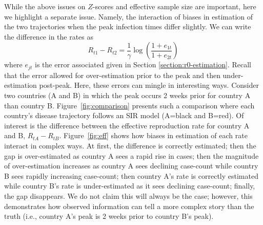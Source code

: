 \documentclass[11pt]{amsart}
\begin{document}
While the above issues on $Z$-scores and effective sample size are important, here we highlight a separate issue.  Namely, the interaction of biases in estimation of the two trajectories when the peak infection times differ slightly.  We can write the difference in the rates as
$$
R_{t1} - R_{t2} = \frac{1}{\gamma} \log \left( \frac{1 + e_{1t}}{1+e_{2t}} \right)
$$
where $e_{jt}$ is the error associated given in Section \ref{section:r0-estimation}.  Recall that the error allowed for over-estimation prior to the peak and then under-estimation post-peak.  Here, these errors can mingle in interesting ways.  Consider two countries (A and B) in which the peak occurs 2 weeks prior for country A than country B.  Figure~\ref{fig:comparison} presents such a comparison where each country's disease trajectory follows an SIR model (A=black and B=red). Of interest is the difference between the effective reproduction rate for country A and B, $R_{tA} - R_{tB}$. Figure~\ref{fig:eff} shows how biases in estimation of each rate interact in complex ways.  At first, the difference is correctly estimated; then the gap is over-estimated as country A sees a rapid rise in cases; then the magnitude of over-estimation increases as country A sees declining case-count while country B sees rapidly increasing case-count; then country A's rate is correctly estimated while country B's rate is under-estimated as it sees declining case-count; finally, the gap disappears.  We do not claim this will always be the case; however, this demonstrates how observed information can tell a more complex story than the truth (i.e., country A's peak is 2 weeks prior to country B's peak).
\end{document}

